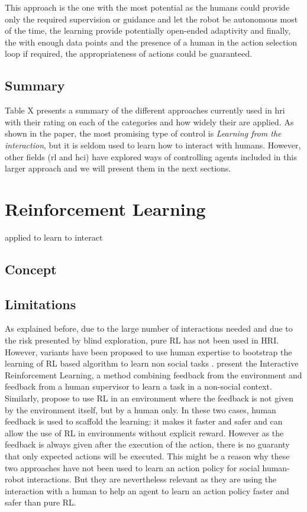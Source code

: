 	This approach is the one with the most potential as the humans could provide only the required supervision or guidance and let the robot be autonomous most of the time, the learning provide potentially open-ended adaptivity and finally, the with enough data points and the presence of a human in the action selection loop if required, the appropriateness of actions could be guaranteed.

\subsection{Summary}

Table X presents a summary of the different approaches currently used in \gls{hri} with their rating on each of the categories and how widely their are applied. As shown in the paper, the most promising type of control is \textit{Learning from the interaction}, but it is seldom used to learn how to interact with humans. However, other fields (\acrlong{rl} and \gls{hci}) have explored ways of controlling agents included in this larger approach and we will present them in the next sections.

\section{Reinforcement Learning} %
 applied to learn to interact

\subsection{Concept}

\subsection{Limitations}
    As explained before, due to the large number of interactions needed and due
    to the risk presented by blind exploration, pure RL has not been used in
    HRI. However, variants have been proposed to use human expertise to
    bootstrap the learning of RL based algorithm to learn non social tasks
    \citep{kober2013reinforcement}. \citet{thomaz2008teachable} present the
    Interactive Reinforcement Learning, a method combining feedback from the
    environment and feedback from a human supervisor to learn a task in a
    non-social context. Similarly, \citet{knox2009interactively} propose to use
    RL in an environment where the feedback is not given by the environment
    itself, but by a human only. In these two cases, human feedback is used to
    scaffold the learning: it makes it faster and safer and can allow the use of
    RL in environments without explicit reward. However as the feedback is
    always given after the execution of the action, there is no guaranty that
    only expected actions will be executed. This might be a reason why these two
    approaches have not been used to learn an action policy for social
    human-robot interactions. But they are nevertheless relevant as they are
    using the interaction with a human to help an agent to learn an action
    policy faster and safer than pure RL.

